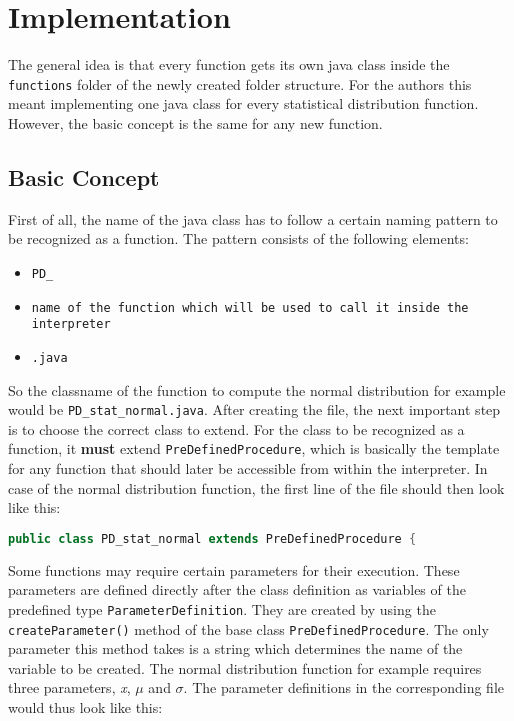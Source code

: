 

\chapter{Implementation}

The general idea is that every function gets its own java class inside the \lstinline{functions} folder of the newly created folder structure. For the authors this meant implementing one java class for every statistical distribution function. However, the basic concept is the same for any new function. 

\section{Basic Concept}

First of all, the name of the java class has to follow a certain naming pattern to be recognized as a function. The pattern consists of the following elements:

\begin{itemize}
	\item \lstinline{PD_}
	\item \lstinline{name of the function which will be used to call it inside the interpreter}
	\item \lstinline{.java}
\end{itemize}

So the classname of the function to compute the normal distribution for example would be \lstinline{PD_stat_normal.java}. After creating the file, the next important step is to choose the correct class to extend. For the class to be recognized as a function, it \textbf{must} extend \lstinline{PreDefinedProcedure}, which is basically the template for any function that should later be accessible from within the interpreter. In case of the normal distribution function, the first line of the file should then look like this:

\begin{center}
	\begin{lstlisting}[caption={Class Definition}, language={java}, label=lis:exampleCode]
		public class PD_stat_normal extends PreDefinedProcedure {
	\end{lstlisting}
\end{center}

Some functions may require certain parameters for their execution. These parameters are defined directly after the class definition as variables of the predefined type \lstinline{ParameterDefinition}. They are created by using the \lstinline{createParameter()} method of the base class \lstinline{PreDefinedProcedure}. The only parameter this method takes is a string which determines the name of the variable to be created. The normal distribution function for example requires three parameters, \textit{x}, $\mu$ and $\sigma$. The parameter definitions in the corresponding file would thus look like this:

